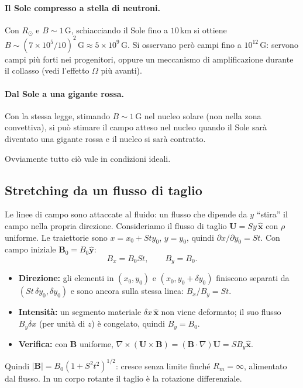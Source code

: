 \paragraph{Il Sole compresso a stella di neutroni.} Con $R_\odot$ e $B\sim1\,$G, schiacciando il Sole fino a $10\,$km si ottiene $B\sim(7\times10^5/10)^2\,\mathrm{G}\approx5\times10^9\,$G. Si osservano però campi fino a $10^{12}\,$G: servono campi più forti nei progenitori, oppure un meccanismo di amplificazione durante il collasso (vedi l'effetto $\Omega$ più avanti).

\paragraph{Dal Sole a una gigante rossa.} Con la stessa legge, stimando $B\sim1\,$G nel nucleo solare (non nella zona convettiva), si può stimare il campo atteso nel nucleo quando il Sole sarà diventato una gigante rossa e il nucleo si sarà contratto.

Ovviamente tutto ciò vale in condizioni ideali.

\subsection{Stretching da un flusso di taglio}

Le linee di campo sono attaccate al fluido: un flusso che dipende da $y$ ``stira'' il campo nella propria direzione. Consideriamo il flusso di taglio $\mathbf{U}=Sy\,\hat{\mathbf{x}}$ con $\rho$ uniforme. Le traiettorie sono $x=x_0+Sty_0$, $y=y_0$, quindi $\partial x/\partial y_0=St$. Con campo iniziale $\mathbf{B}_0=B_0\hat{\mathbf{y}}$:
\begin{equation}
B_x=B_0St,\qquad B_y=B_0 .
\end{equation}
\begin{itemize}
\item \textbf{Direzione:} gli elementi in $(x_0,y_0)$ e $(x_0,y_0+\delta y_0)$ finiscono separati da $(St\,\delta y_0,\delta y_0)$ e sono ancora sulla stessa linea: $B_x/B_y=St$.
\item \textbf{Intensità:} un segmento materiale $\delta x\,\hat{\mathbf{x}}$ non viene deformato; il suo flusso $B_y\delta x$ (per unità di $z$) è congelato, quindi $B_y=B_0$.
\item \textbf{Verifica:} con $\mathbf{B}$ uniforme, $\nabla\times(\mathbf{U}\times\mathbf{B})=(\mathbf{B}\cdot\nabla)\mathbf{U}=SB_y\hat{\mathbf{x}}$.
\end{itemize}
Quindi $|\mathbf{B}|=B_0(1+S^2t^2)^{1/2}$: cresce senza limite finché $R_m=\infty$, alimentato dal flusso. In un corpo rotante il taglio è la rotazione differenziale.

